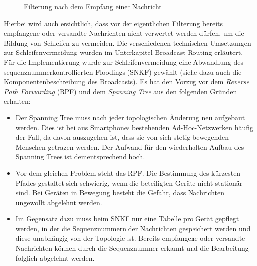\begin{figure}[H]
	\centering
	\hspace*{1cm}
	\caption{Filterung nach dem Empfang einer Nachricht}
	\label{fig:empfangNachricht}
\end{figure}
Hierbei wird auch ersichtlich, dass vor der eigentlichen Filterung bereits empfangene oder versandte Nachrichten nicht verwertet werden dürfen, um die Bildung von Schleifen zu vermeiden. Die verschiedenen technischen Umsetzungen zur Schleifenvermeidung wurden im Unterkapitel Broadcast-Routing erläutert. 
\\Für die Implementierung wurde zur Schleifenvermeidung eine Abwandlung des sequenznummerkontrollierten Floodings (SNKF) gewählt (siehe dazu auch die Komponentenbeschreibung des Broadcasts). Es hat den Vorzug vor dem \textit{Reverse Path Forwarding} (RPF) und dem \textit{Spanning Tree} aus den folgenden Gründen erhalten:
\begin{itemize}
	\item Der Spanning Tree muss nach jeder topologischen Änderung neu aufgebaut werden. Dies ist bei aus Smartphones bestehenden Ad-Hoc-Netzwerken häufig der Fall, da davon auszugehen ist, dass sie von sich stetig bewegenden Menschen getragen werden. Der Aufwand für den wiederholten Aufbau des Spanning Trees ist dementsprechend hoch.
	\item Vor dem gleichen Problem steht das RPF. Die Bestimmung des kürzesten Pfades gestaltet sich schwierig, wenn die beteiligten Geräte nicht stationär sind. Bei Geräten in Bewegung besteht die Gefahr, dass Nachrichten ungewollt abgelehnt werden.
	\item Im Gegensatz dazu muss beim SNKF nur eine Tabelle pro Gerät gepflegt werden, in der die Sequenznummern der Nachrichten gespeichert werden und diese unabhängig von der Topologie ist. Bereits empfangene oder versandte Nachrichten können durch die Sequenznummer erkannt und die Bearbeitung folglich abgelehnt werden.
\end{itemize}
